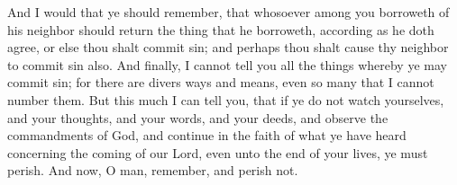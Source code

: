 \bverse \iffalse And I would that ye should remember, that whosoever among you borroweth of his neighbor should return the thing that he borroweth, according as he doth agree, or else thou shalt commit sin; and perhaps thou shalt cause thy neighbor to commit sin also. \fi
And I would that ye should remember, that whosoever among you borroweth of his neighbor should return the thing that he borroweth, according as he doth agree, or else thou shalt commit sin; and perhaps thou shalt cause thy neighbor to commit sin also.
\bverse \iffalse And finally, I cannot tell you all the things whereby ye may commit sin; for there are divers ways and means, even so many that I cannot number them. \fi
And finally, I cannot tell you all the things whereby ye may commit sin; for there are divers ways and means, even so many that I cannot number them.
\bverse \iffalse But this much I can tell you, that if ye do not watch yourselves, and your thoughts, and your words, and your deeds, and observe the commandments of God, and continue in the faith of what ye have heard concerning the coming of our Lord, even unto the end of your lives, ye must perish. And now, O man, remember, and perish not. \fi
But this much I can tell you, that if ye do not watch yourselves, and your thoughts, and your words, and your deeds, and observe the commandments of God, and continue in the faith of what ye have heard concerning the coming of our Lord, even unto the end of your lives, ye must perish. And now, O man, remember, and perish not.

